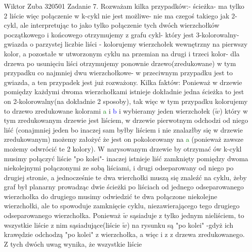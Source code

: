 \documentclass{article}
\begin{document}
Wiktor Zuba 320501
\newline
Zadanie 7.
\newline
\newline
Rozważam kilka przypadków:- ścieżka- ma tylko 2 liście więc połączenie w k-cykl nie jest możliwe- nie ma czegoś takiego jak 2-cykl, ale interpretując to jako tylko połączenie tych dwóch
wierzchołków początkowego i końcowego otrzymujemy z grafu cykl- który jest 3-kolorowalny- gwiazda o parzystej liczbie liści - kolorujemy wierzchołek wewnętrzny na pierwszy kolor,
a pozostałe w utworzonym cyklu na przemian na drugi i trzeci kolor- dla drzewa po usunięciu liści otrzymujemy ponownie drzewo(zredukowane) w tym przypadku co najmniej dwu wierzchołkowe- w przeciwnym przypadku jest to gwiazda,
a ten przypadek jest już rozważony.\newline\newline
Kilka faktów:\newline
Ponieważ w drzewie pomiędzy każdymi dwoma wierzchołkami istnieje dokładnie jedna ścieżka to jest on 2-kolorowalny(na dokładnie 2 sposoby),
tak więc w tym przypadku kolorujemy to drzewo zredukowane kolorami \textcolor{Green}{a} i \textcolor{blue}{b} i wybieramy jeden wierzchołek 
($\widetilde{w}$) który w tym zredukowanym drzewie jest liściem,
w drzewie pierwotnym odchodzi od niego liść (conajmniej jeden bo inaczej sam byłby liściem i nie znalazłby się w drzewie zredukowanym)
możemy założyć że jest on pokolorowany na \textcolor{Green}{a} (ponieważ zawsze możemy odwrócić te 2 kolory).\newline
W narysowanym drzewie by otrzymać ów k-cykl musimy połączyć liście "po kolei"- inaczej istnieje liść zamknięty pomiędzy dwoma niekolejnymi połączonymi ze sobą
liściami, i drugi odseparowany od niego po drugiej stronie, a jednocześnie te dwa wierchołki muszą się znaleźć na cyklu,
żeby graf był planarny prowadząc dwie ścieżki po liściach od jednego odseparowanego wierzchołka do drugiego musimy odwiedzić te dwa połączone niekolejne wierzchołki,
ale to spowoduje zamknięcie cyklu, niezawierającego tego drugiego odseparowanego wierzchołka.\newline
Ponieważ $\widetilde{w}$ sąsiaduje z tylko jednym nieliściem, to wszystkie liście z nim sąsiadujące(liście $\widetilde{w}$) na rysunku są "po kolei"
-gdyż ich krawędzie odchodzą "po kolei" z wierzchołka, a więc i z z drzewa zredukowanego. Z tych dwóch uwag wynika, że wszystkie liście
\end{document}
